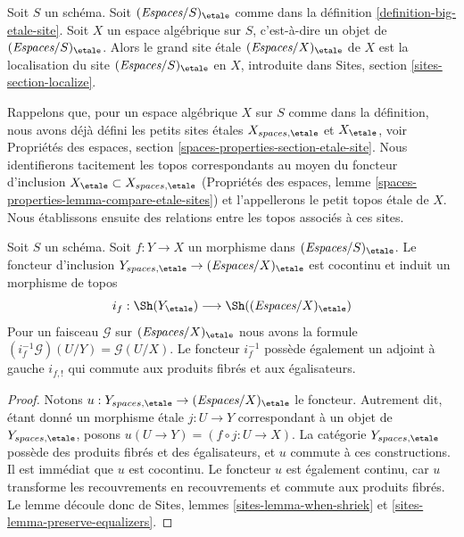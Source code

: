 \begin{definition}
\label{definition-big-small-etale}
Soit $S$ un schéma. Soit $(\textit{Espaces}/S)_\etale$ comme dans
la définition \ref{definition-big-etale-site}.
Soit $X$ un espace algébrique sur $S$, c'est-à-dire un objet de
$(\textit{Espaces}/S)_\etale$. Alors le grand site \'etale
{\it $(\textit{Espaces}/X)_\etale$} de $X$
est la localisation du site $(\textit{Espaces}/S)_\etale$
en $X$, introduite dans Sites, section \ref{sites-section-localize}.
\end{definition}

\noindent
Rappelons que, pour un espace algébrique $X$ sur $S$ comme dans
la définition, nous avons déjà défini les petits sites \'etales
$X_{spaces, \etale}$ et $X_\etale$, voir
Propriétés des espaces, section \ref{spaces-properties-section-etale-site}.
Nous identifierons tacitement les topos correspondants au moyen du
foncteur d'inclusion $X_\etale \subset X_{spaces, \etale}$
(Propriétés des espaces, lemme \ref{spaces-properties-lemma-compare-etale-sites})
et l'appellerons le petit topos \'etale de $X$.
Nous établissons ensuite des relations entre les topos
associés à ces sites.

\begin{lemma}
\label{lemma-put-in-T-etale}
Soit $S$ un schéma. Soit $f : Y \to X$ un morphisme dans
$(\textit{Espaces}/S)_\etale$. Le foncteur d'inclusion
$Y_{spaces, \etale} \to (\textit{Espaces}/X)_\etale$
est cocontinu et induit un morphisme de topos
$$
i_f :
\Sh(Y_\etale)
\longrightarrow
\Sh((\textit{Espaces}/X)_\etale)
$$
Pour un faisceau $\mathcal{G}$ sur $(\textit{Espaces}/X)_\etale$
nous avons la formule $(i_f^{-1}\mathcal{G})(U/Y) = \mathcal{G}(U/X)$.
Le foncteur $i_f^{-1}$ possède également un adjoint à gauche $i_{f, !}$ qui commute
aux produits fibrés et aux égalisateurs.
\end{lemma}

\begin{proof}
Notons $u : Y_{spaces, \etale} \to (\textit{Espaces}/X)_\etale$ le foncteur.
Autrement dit, étant donné un morphisme \'etale $j : U \to Y$ correspondant
à un objet de $Y_{spaces, \etale}$, posons
$u(U \to Y) = (f \circ j : U \to X)$.
La catégorie $Y_{spaces, \etale}$
possède des produits fibrés et des égalisateurs, et $u$ commute à ces constructions.
Il est immédiat que $u$ est cocontinu.
Le foncteur $u$ est également continu, car $u$ transforme les recouvrements en recouvrements et
commute aux produits fibrés. Le lemme découle donc de
Sites, lemmes \ref{sites-lemma-when-shriek}
et \ref{sites-lemma-preserve-equalizers}.
\end{proof}

